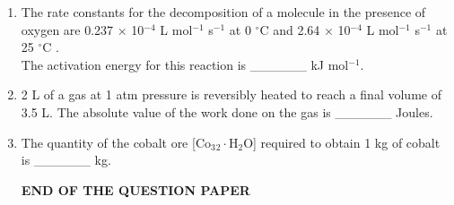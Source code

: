 \documentclass[journal,12pt,onecolumn]{IEEEtran}
\begin{document}
\begin{enumerate}
\item The rate constants for the decomposition of a molecule in the presence of oxygen are 
0.237 $\times$ 10$^{-4}$ L mol$^{-1}$ s$^{-1}$ at 0 $^\circ$C and 
2.64 $\times$ 10$^{-4}$ L mol$^{-1}$ s$^{-1}$ at 25 $^\circ$C 
. \\
The activation energy for this reaction  is \_\_\_\_\_\_ kJ mol$^{-1}$.
\hfill{}


\item 2 L of a gas at 1 atm pressure is reversibly heated to reach a final volume of 3.5 L. 
The absolute value of the work done on the gas  is \_\_\_\_\_\_ Joules.
\newline
\hfill{}

\item The quantity of the cobalt ore [Co$_3$$_2 \cdot$H$_2$O] required to obtain 1 kg of cobalt  is \_\_\_\_\_\_ kg. \\

\hfill{}

\begin{center}
    
\textbf{END OF THE QUESTION PAPER}
\end{center}    
\end{enumerate}
\end{document}
